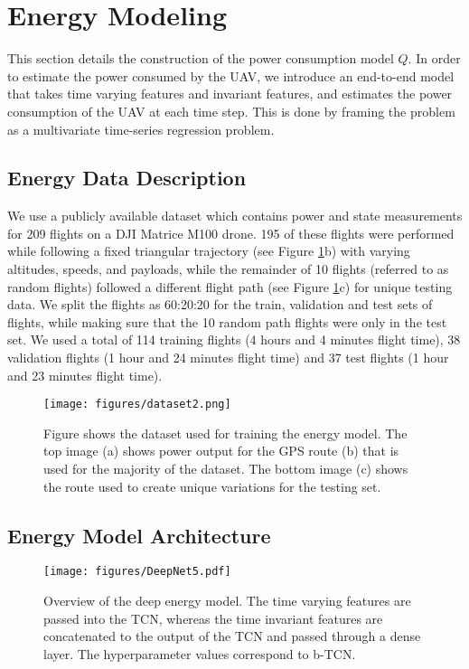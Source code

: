 \documentclass[letterpaper, 10 pt, conference]{ieeeconf}
\begin{document}
\section{Energy Modeling}
\label{sec:energy_model}
This section details the construction of the power consumption model $Q$. In order to estimate the power consumed by the UAV, we introduce an end-to-end model that takes time varying features and invariant features, and estimates the power consumption of the UAV at each time step. This is done by framing the problem as a multivariate time-series regression problem.
\subsection{Energy Data Description}

We use a publicly available dataset \cite{rodrigues2021inflight, Rodrigues} which contains power and state measurements for 209 flights on a DJI Matrice M100 drone. 195 of these flights were performed while following a fixed triangular trajectory (see Figure \ref{fig:flight_paths}b) with varying altitudes, speeds, and payloads, while the remainder of 10 flights (referred to as random flights) followed a different flight path (see Figure \ref{fig:flight_paths}c) for unique testing data. We split the flights as 60:20:20 for the train, validation and test sets of flights, while making sure that the 10 random path flights were only in the test set. We used a total of 114 training flights (4 hours and 4 minutes flight time), 38 validation flights (1 hour and 24 minutes flight time) and 37 test flights (1 hour and 23 minutes flight time).
\begin{figure}
    \centering
    \texttt{[image: figures/dataset2.png]}
    \caption{Figure shows the dataset used for training the energy model. The top image (a) shows power output for the GPS route (b) that is used for the majority of the dataset. The bottom image (c) shows the route used to create unique variations for the testing set.}
    \label{fig:flight_paths}
    \vspace{-3.5mm}
\end{figure}
\subsection{Energy Model Architecture}

\begin{figure}
    \centering
    \texttt{[image: figures/DeepNet5.pdf]} 
\caption{Overview of the deep energy model. The time varying features are passed into the TCN, whereas the time invariant features are concatenated to the output of the TCN and passed through a dense layer. The hyperparameter values correspond to b-TCN.}
    \label{fig:deep_net}
\end{figure}
\end{document}
